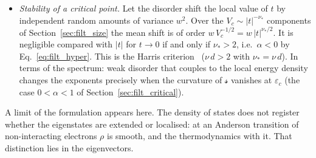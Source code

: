 \documentclass[10pt,a4paper]{article}
\theoremstyle{plain}
\newcommand{\lds}{\mathscr{s}}  %
\begin{document}
\begin{itemize}
  solution. First, the heat capacity is continuous at $T_f$ and its slope
  jumps; this is a non-analytic term of third order on one side of
  $\varepsilon_c$, subleading to the curvature of Eq.~\eqref{eq:filt_sk}:
  $2-\alpha=\sigma=3$ in Eq.~\eqref{eq:filt_critexp2}. Second, the lower
  edge lies at
  $\varepsilon_0\simeq-0.763\,J$~\cite{Parisi1979,CrisantiRizzo2002}, above
  the energy $-J\sqrt{\ln2}\simeq-0.833\,J$ at which Eq.~\eqref{eq:filt_sk}
  vanishes: the low-lying levels are fewer than the average count. Third,
  at low temperature the distribution of the local fields
  $\sum_jJ_{ij}x_j$, whose magnitude is half the energy required to reverse
  the spin at the site $i$, vanishes linearly at zero
  field~\cite{TAP1977}. In the terms of Eq.~\eqref{eq:filt_tls} this is
  $\theta=2$, i.e.\ $c_\mu\propto T^{2}$ and
  $\lds\propto(\delta\varepsilon)^{2/3}$, without a residual
  entropy~\cite{CrisantiRizzo2002}. The non-negativity of $\lds$
  (Section~\ref{sec:large_ext}) is a criterion for approximate solutions:
  the replica-symmetric solution has $S/V<0$ at
  $T=0$~\cite{SherringtonKirkpatrick1975}, \cite[Sec.~13.4.3]{Plischke}, and
  therefore corresponds to no spectrum.
\item \emph{Stability of a critical point.} Let the disorder shift the local
  value of $t$ by independent random amounts of variance $w^{2}$. Over the
  $V_c\sim|t|^{-\nu_*}$ components of Section~\ref{sec:filt_size} the mean
  shift is of order $w\,V_c^{-1/2}=w\,|t|^{\nu_*/2}$. It is negligible
  compared with $|t|$ for $t\to0$ if and only if $\nu_*>2$, i.e.\ $\alpha<0$
  by Eq.~\eqref{eq:filt_hyper}. This is the Harris
  criterion~\cite{Harris1974} ($\nu\,d>2$ with $\nu_*=\nu\,d$). In terms of
  the spectrum: weak disorder that couples to the local energy density
  changes the exponents precisely when the curvature of $\lds$ vanishes at
  $\varepsilon_c$ (the case $0<\alpha<1$ of Section~\ref{sec:filt_critical}).
\end{itemize}
A limit of the formulation appears here. The density of states does not
register whether the eigenstates are extended or localised: at an Anderson
transition of non-interacting electrons $\rho$ is smooth, and the
thermodynamics with it. That distinction lies in the eigenvectors.
\end{document}
